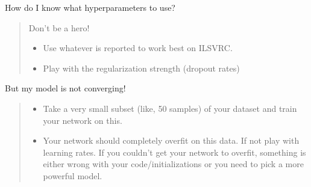 \documentclass[a4paper]{tufte-handout}
\begin{document}
\noindent How do I know what hyperparameters to use?

\begin{quote}
Don't be a hero!

\begin{itemize}
\item
  Use whatever is reported to work best on ILSVRC.
\item
  Play with the regularization strength (dropout rates)
\end{itemize}
\end{quote}

\noindent But my model is not converging!

\begin{quote}
\begin{itemize}
\item
  Take a very small subset (like, 50 samples) of your dataset and train
  your network on this.
\item
  Your network should completely overfit on this data. If not play with
  learning rates. If you couldn't get your network to overfit, something
  is either wrong with your code/initializations or you need to pick a
  more powerful model.
\end{itemize}
\end{quote}
\end{document}
